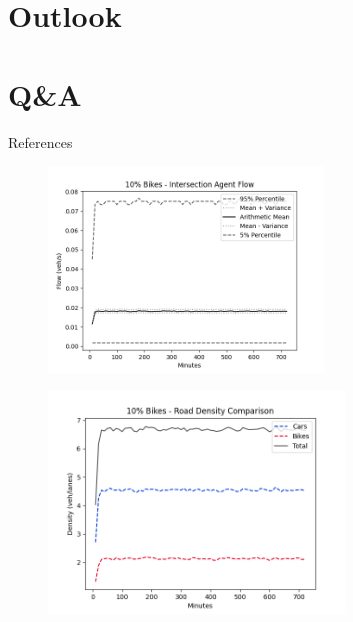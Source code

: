 \documentclass[compress,aspectratio=169]{beamer}
\begin{document}
\section{Outlook}



\section{Q\&A}

\begin{frame}{References}
\printbibliography
\end{frame}

\appendix
\begin{frame}
\vspace{-0.2cm}
        \begin{figure}
		\includegraphics[width=0.65\textwidth]{Images/intersection_agent_flow.png}
	\end{figure}
\end{frame}

\begin{frame}
\vspace{-0.2cm}
        \begin{figure}
		\includegraphics[width=0.7\textwidth]{Images/road_density_comparison.png}
	\end{figure}
\end{frame}
\end{document}
